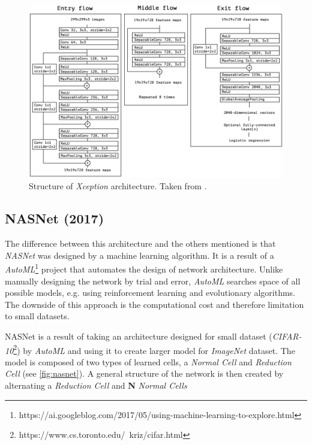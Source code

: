 \begin{figure}
    \includegraphics[width=\textwidth]{img/xception}
    \caption{Structure of \textit{Xception} architecture. Taken from \cite[fig. 5]{bib:xception}.}
    \label{fig:xception}
\end{figure}


\subsection{NASNet (2017)}
\label{sec:nasnet}
The difference between this architecture and the others mentioned is that \textit{NASNet} \cite{bib:nasnet} was designed by a machine learning algorithm. It is a result of a \textit{AutoML}\footnote{https://ai.googleblog.com/2017/05/using-machine-learning-to-explore.html} project that automates the design of network architecture. Unlike manually designing the network by trial and error, \textit{AutoML} searches space of all possible models, e.g. using reinforcement learning and evolutionary algorithms. The downside of this approach is the computational cost and therefore limitation to small datasets.

NASNet is a result of taking an architecture designed for small dataset (\textit{CIFAR-10}\footnote{https://www.cs.toronto.edu/~kriz/cifar.html}) by \textit{AutoML} and using it to create larger model for \textit{ImageNet} dataset. The model is composed of two types of learned cells, a \textit{Normal Cell} and \textit{Reduction Cell} (see \cref{fig:nasnet}). A general structure of the network is then created by alternating a \textit{Reduction Cell} and \textbf{N} \textit{Normal Cells}

